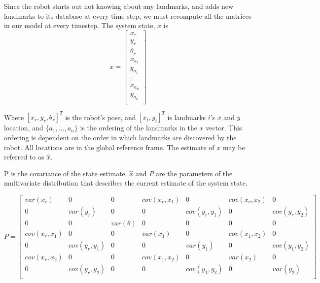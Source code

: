 \documentclass[prodmode,acmtecs]{acmsmall} %
\begin{document}
Since the robot starts out not knowing about any landmarks, and adds new landmarks to its database at every time step, we must recompute all the matrices in our model at every timestep. The system state, $x$ is
$$
x 
= 
\begin{bmatrix}
    x_r \\
    y_r \\
    \theta_r \\
    x_{a_1} \\
    y_{a_1} \\
    \vdots \\
    x_{a_n} \\
    y_{a_n} \\
\end{bmatrix}
$$

Where $[x_r, y_r, \theta_r]^T$ is the robot's pose, and $[x_i, y_i]^T$ is landmarks $i$'s $x$ and $y$ location, and $\{a_1,\ldots,a_n\}$ is the ordering of the landmarks in the $x$ vector. This ordering is dependent on the order in which landmarks are discovered by the robot. All locations are in the global reference frame. The estimate of $x$ may be referred to as $\hat{x}$.

P is the covariance of the state estimate. $\hat{x}$ and $P$ are the parameters of the multivariate distribution that describes the current estimate of the system state.

$$
P =
\begin{bmatrix}
    var(x_r)     & 0            & 0               & cov(x_r,x_1) & 0            & cov(x_r,x_2) & 0            \\
    0            & var(y_r)     & 0               & 0            & cov(y_r,y_1) & 0            & cov(y_r,y_2) \\
    0            & 0            & var(\theta)     & 0            & 0            & 0            & 0            \\
    cov(x_r,x_1) & 0            & 0               & var(x_1)     & 0            & cov(x_1,x_2) & 0            \\
    0            & cov(y_r,y_1) & 0               & 0            & var(y_1)     & 0            & cov(y_1,y_2) \\
    cov(x_r,x_2) & 0            & 0               & cov(x_1,x_2) & 0            & var(x_2)     & 0            \\
    0            & cov(y_r,y_2) & 0               & 0            & cov(y_1,y_2) & 0            & var(y_2)     \\
\end{bmatrix}
$$
\end{document}
